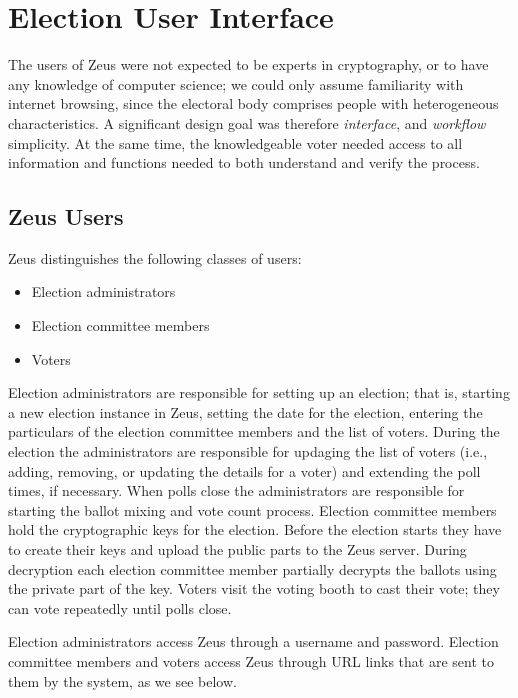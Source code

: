 \documentclass[letterpaper,twocolumn,10pt]{article}
\begin{document}
\section{Election User Interface}

The users of Zeus were not expected to be experts in cryptography, or
to have any knowledge of computer science; we could only assume
familiarity with internet browsing, since the electoral body comprises
people with heterogeneous characteristics. A significant design goal
was therefore \emph{interface}, and \emph{workflow} simplicity. At the
same time, the knowledgeable voter needed access to all information
and functions needed to both understand and verify the process.

\subsection{Zeus Users}

Zeus distinguishes the following classes of users:

\begin{itemize}
\item Election administrators
\item Election committee members
\item Voters
\end{itemize}

Election administrators are responsible for setting up an election;
that is, starting a new election instance in Zeus, setting the date
for the election, entering the particulars of the election committee
members and the list of voters. During the election the administrators
are responsible for updaging the list of voters (i.e., adding,
removing, or updating the details for a voter) and extending the poll
times, if necessary. When polls close the administrators are
responsible for starting the ballot mixing and vote count process.
Election committee members hold the cryptographic keys for the
election. Before the election starts they have to create their keys
and upload the public parts to the Zeus server. During decryption each
election committee member partially decrypts the ballots using the
private part of the key. Voters visit the voting booth to cast their
vote; they can vote repeatedly until polls close.

Election administrators access Zeus through a username and password.
Election committee members and voters access Zeus through URL links
that are sent to them by the system, as we see below.
\end{document}
